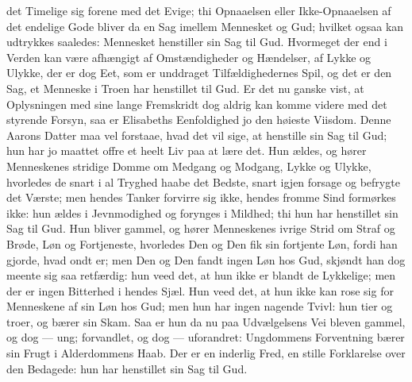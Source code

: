 \documentclass[12pt,a4paper]{book}
\begin{document}
det Timelige sig forene med det Evige; thi Opnaaelsen eller
Ikke-Opnaaelsen af det endelige Gode bliver da en Sag imellem Mennesket
og Gud; hvilket ogsaa kan udtrykkes saaledes: Mennesket henstiller sin
Sag til Gud. Hvormeget der end i Verden kan være afhængigt af
Omstændigheder og Hændelser, af Lykke og Ulykke, der er dog Eet, som er
unddraget Tilfældighedernes Spil, og det er den Sag, et Menneske i
Troen har henstillet til Gud. Er det nu ganske vist, at Oplysningen med
sine lange Fremskridt dog aldrig kan komme videre med det styrende
Forsyn, saa er Elisabeths Eenfoldighed jo den høieste Viisdom. Denne
Aarons Datter maa vel forstaae, hvad det vil sige, at henstille sin Sag
til Gud; hun har jo maattet offre et heelt Liv paa at lære det. Hun
ældes, og hører Menneskenes stridige Domme om Medgang og Modgang, Lykke
og Ulykke, hvorledes de snart i al Tryghed haabe det Bedste, snart
igjen forsage og befrygte det Værste; men hendes Tanker forvirre sig
ikke, hendes fromme Sind formørkes ikke: hun ældes i Jevnmodighed og
forynges i Mildhed; thi hun har henstillet sin Sag til Gud. Hun bliver
gammel, og hører Menneskenes ivrige Strid om Straf og Brøde, Løn og
Fortjeneste, hvorledes Den og Den fik sin fortjente Løn, fordi han
gjorde, hvad ondt er; men Den og Den fandt ingen Løn hos Gud, skjøndt
han dog meente sig saa retfærdig: hun veed det, at hun ikke er blandt
de Lykkelige; men der er ingen Bitterhed i hendes Sjæl. Hun veed det,
at hun ikke kan rose sig for Menneskene af sin Løn hos Gud; men hun har
ingen nagende Tvivl: hun tier og troer, og bærer sin Skam. Saa er hun
da nu paa Udvælgelsens Vei bleven gammel, og dog --- ung; forvandlet,
og dog --- uforandret: Ungdommens Forventning bærer sin Frugt i
Alderdommens Haab. Der er en inderlig Fred, en
stille Forklarelse over den Bedagede: hun har henstillet sin Sag til Gud.
\end{document}
